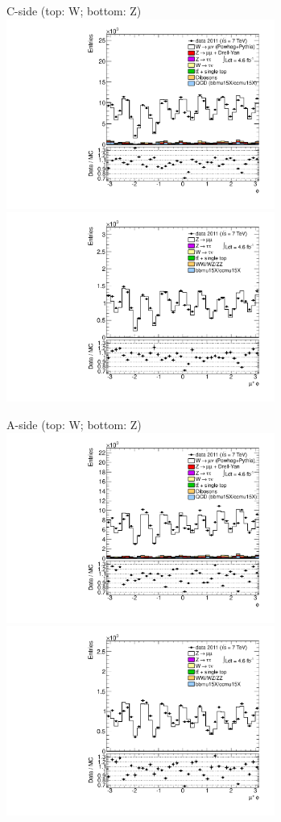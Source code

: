 {

\colb[T]

C-side (top: W; bottom: Z)
\centering
\includegraphics[width=0.66\textwidth]{dates/20130306/figures/etaphi/W_5_C_stack_l_phi_POS} \\
\includegraphics[width=0.66\textwidth]{dates/20130306/figures/etaphi/Z_5_C_stack_lP_phi_ALL.pdf}

A-side (top: W; bottom: Z)
\centering
\includegraphics[width=0.66\textwidth]{dates/20130306/figures/etaphi/W_5_A_stack_l_phi_POS} \\
\includegraphics[width=0.66\textwidth]{dates/20130306/figures/etaphi/Z_5_A_stack_lP_phi_ALL.pdf} 

\cole
}


